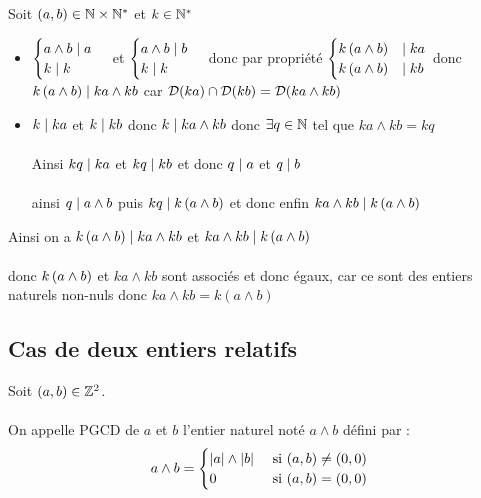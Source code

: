 \begin{dem}
	Soit \((a, b) \in \mathbb{N} \times \mathbb{N}^*\) et \(k \in \mathbb{N}^*\)
	\begin{itemize}
		\item \(\begin{cases}
			      a\wedge b \mid a \\
			      k \mid k
		      \end{cases}\)
		      et
		      \(\begin{cases}
			      a\wedge b \mid b \\
			      k \mid k
		      \end{cases}\)
		      donc par propriété
		      \(\begin{cases}
			      k\left(a\wedge b\right) & \mid ka \\
			      k\left(a\wedge b\right) & \mid kb
		      \end{cases}\) donc \(k\left(a\wedge b\right) \mid ka\wedge kb\) car \(\mathcal{D}(ka)\cap \mathcal{D}(kb) = \mathcal{D}(ka\wedge kb)\)
		\item \(k \mid ka\) et \(k \mid kb\) donc \(k \mid ka \wedge kb\) donc \(\exists q \in \mathbb{N}\) tel que \(ka \wedge kb = kq\)\\~\\
		      Ainsi \(kq\mid ka\) et \(kq\mid kb\) et donc \(q\mid a\) et \(q \mid b\)\\~\\
		      ainsi \(q \mid a\wedge b\) puis \(kq \mid k\left(a\wedge b\right)\) et donc enfin \(ka \wedge kb \mid k\left( a \wedge b\right)\)
	\end{itemize}
	Ainsi on a \(k\left(a\wedge b\right) \mid ka\wedge kb\) et \(ka \wedge kb \mid k\left( a \wedge b\right)\) \\~\\
	donc \(k\left(a\wedge b\right) \) et \(ka\wedge kb\) sont associés et donc égaux, car ce sont des entiers naturels non-nuls donc \(ka \wedge kb = k (a \wedge b)\)
\end{dem}

\subsection{Cas de deux entiers relatifs}

\begin{defi}
	Soit \((a, b) \in \mathbb{Z}^2\). \\~\\
	On appelle PGCD de \(a\) et \(b\) l’entier naturel noté \(a \wedge b\) défini par :
	\[a \wedge b = \begin{cases}
			\left\lvert a\right\rvert \wedge \left\lvert b\right\rvert & \text{ si } (a, b) \neq (0, 0) \\
			0                      & \text{ si } (a, b) = (0, 0)
		\end{cases}
	\]
\end{defi}

